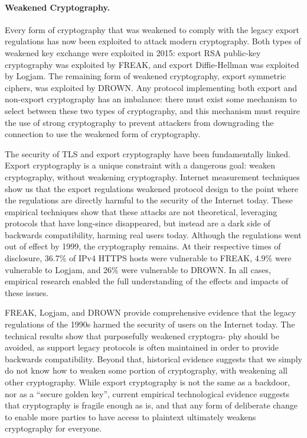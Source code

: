 \paragraph{Weakened Cryptography.}
Every form of cryptography that was weakened to comply with the legacy export
regulations has now been exploited to attack modern cryptography. Both types
of weakened key exchange were exploited in 2015: export RSA public-key
cryptography was exploited by FREAK, and export Diffie-Hellman was exploited
by Logjam. The remaining form of weakened cryptography, export symmetric
ciphers, was exploited by DROWN. Any protocol implementing both export and
non-export cryptography has an imbalance: there must exist some mechanism to
select between these two types of cryptography, and this mechanism must
require the use of strong cryptography to prevent attackers from downgrading
the connection to use the weakened form of cryptography.

The security of TLS and export cryptography have been fundamentally linked.
Export cryptography is a unique constraint with a dangerous goal: weaken
cryptography, without weakening cryptography. Internet measurement techniques
show us that the export regulations weakened protocol design to the point
where the regulations are directly harmful to the security of the Internet
today. These empirical techniques show that these attacks are not
theoretical, leveraging protocols that have long-since disappeared, but
instead are a dark side of backwards compatibility, harming real users today.
Although the regulations went out of effect by 1999, the cryptography
remains. At their respective times of disclosure, 36.7\% of IPv4 HTTPS hosts
were vulnerable to FREAK, 4.9\% were vulnerable to Logjam, and 26\% were
vulnerable to DROWN. In all cases, empirical research enabled the full
understanding of the effects and impacts of these issues.

FREAK, Logjam, and DROWN provide comprehensive evidence that the legacy
regulations of the 1990s harmed the security of users on the Internet today.
The technical results show that purposefully weakened cryptogra- phy should
be avoided, as support legacy protocols is often maintained in order to
provide backwards compatibility. Beyond that, historical evidence suggests
that we simply do not know how to weaken some portion of cryptography, with
weakening all other cryptography. While export cryptography is not the same
as a backdoor, nor as a “secure golden key”, current empirical technological
evidence suggests that cryptography is fragile enough as is, and that any
form of deliberate change to enable more parties to have access to plaintext
ultimately weakens cryptography for everyone.

